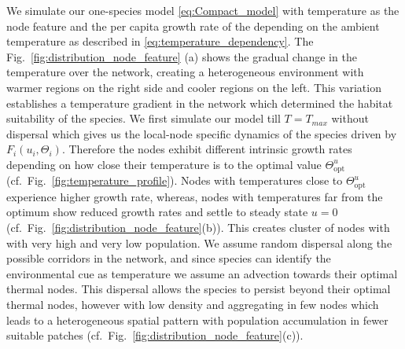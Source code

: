 \documentclass[12pt]{article}
\begin{document}
We simulate our one-species model \eqref{eq:Compact_model} with temperature as the node feature and the per capita growth rate of the  depending on the ambient temperature as described in \eqref{eq:temperature_dependency}. The Fig.~\ref{fig:distribution_node_feature} (a) shows the gradual change in the temperature over the network, creating a heterogeneous environment with warmer regions on the right side and cooler regions on the left. This variation establishes a temperature gradient in the network which determined the habitat suitability of the species. We first simulate our model till $T=T_{max}$ without dispersal which gives us the local-node specific dynamics of the species driven by $F_i(u_i,\Theta_i)$. Therefore the nodes exhibit different intrinsic growth rates depending on how close their temperature is to the optimal value $\Theta^u_{\mathrm{opt}}$ (cf.~Fig.~\ref{fig:temperature_profile}). Nodes with temperatures close to $\Theta^u_{\mathrm{opt}}$ experience higher growth rate, whereas, nodes with temperatures far from the optimum show reduced growth rates and settle to steady state $u=0$ (cf.~Fig.~\ref{fig:distribution_node_feature}(b)). This creates cluster of nodes with with very high and very low population. We assume random dispersal along the possible corridors in the network, and since species can identify the environmental cue as temperature we assume an advection towards their optimal thermal nodes. This dispersal allows the species to persist beyond their optimal thermal nodes, however with low density and aggregating in few nodes which leads to a heterogeneous spatial pattern with population accumulation in fewer suitable patches (cf.~Fig.~\ref{fig:distribution_node_feature}(c)).
\end{document}
